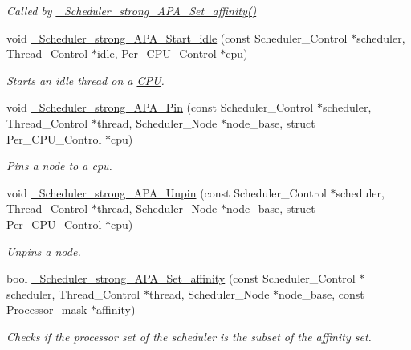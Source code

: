 \begin{DoxyCompactItemize}
\begin{DoxyCompactList}\small\item\em Called by \hyperlink{group__RTEMSScoreSchedulerStrongAPA_ga63ef624a9881cf77a2b1eef2c6f05223}{\+\_\+\+Scheduler\+\_\+strong\+\_\+\+A\+P\+A\+\_\+\+Set\+\_\+affinity()} \end{DoxyCompactList}\item 
void \hyperlink{group__RTEMSScoreSchedulerStrongAPA_ga218140a63c8168bd7a031ecd1622ac70}{\+\_\+\+Scheduler\+\_\+strong\+\_\+\+A\+P\+A\+\_\+\+Start\+\_\+idle} (const Scheduler\+\_\+\+Control $\ast$scheduler, Thread\+\_\+\+Control $\ast$idle, Per\+\_\+\+C\+P\+U\+\_\+\+Control $\ast$cpu)
\begin{DoxyCompactList}\small\item\em Starts an idle thread on a \hyperlink{structCPU}{C\+PU}. \end{DoxyCompactList}\item 
void \hyperlink{group__RTEMSScoreSchedulerStrongAPA_gab58b35b304568f654b0159782d7101b0}{\+\_\+\+Scheduler\+\_\+strong\+\_\+\+A\+P\+A\+\_\+\+Pin} (const Scheduler\+\_\+\+Control $\ast$scheduler, Thread\+\_\+\+Control $\ast$thread, Scheduler\+\_\+\+Node $\ast$node\+\_\+base, struct Per\+\_\+\+C\+P\+U\+\_\+\+Control $\ast$cpu)
\begin{DoxyCompactList}\small\item\em Pins a node to a cpu. \end{DoxyCompactList}\item 
void \hyperlink{group__RTEMSScoreSchedulerStrongAPA_ga14316e4743f9418a6fba4de3d982418a}{\+\_\+\+Scheduler\+\_\+strong\+\_\+\+A\+P\+A\+\_\+\+Unpin} (const Scheduler\+\_\+\+Control $\ast$scheduler, Thread\+\_\+\+Control $\ast$thread, Scheduler\+\_\+\+Node $\ast$node\+\_\+base, struct Per\+\_\+\+C\+P\+U\+\_\+\+Control $\ast$cpu)
\begin{DoxyCompactList}\small\item\em Unpins a node. \end{DoxyCompactList}\item 
bool \hyperlink{group__RTEMSScoreSchedulerStrongAPA_ga63ef624a9881cf77a2b1eef2c6f05223}{\+\_\+\+Scheduler\+\_\+strong\+\_\+\+A\+P\+A\+\_\+\+Set\+\_\+affinity} (const Scheduler\+\_\+\+Control $\ast$scheduler, Thread\+\_\+\+Control $\ast$thread, Scheduler\+\_\+\+Node $\ast$node\+\_\+base, const Processor\+\_\+mask $\ast$affinity)
\begin{DoxyCompactList}\small\item\em Checks if the processor set of the scheduler is the subset of the affinity set. \end{DoxyCompactList}\end{DoxyCompactItemize}


